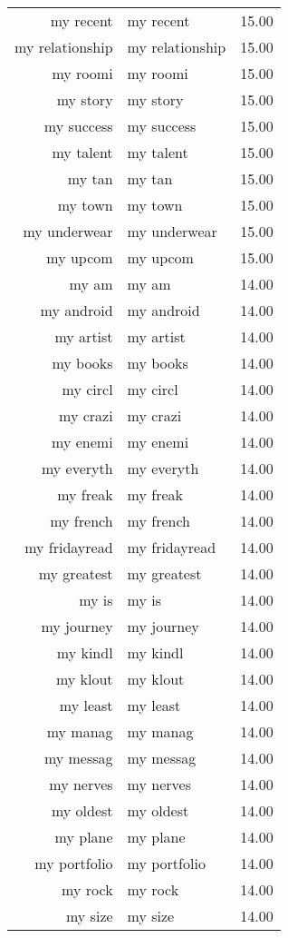 \begin{table}[ht]
\begin{tabular}{rlr}
  my recent & my recent & 15.00 \\ 
  my relationship & my relationship & 15.00 \\ 
  my roomi & my roomi & 15.00 \\ 
  my story & my story & 15.00 \\ 
  my success & my success & 15.00 \\ 
  my talent & my talent & 15.00 \\ 
  my tan & my tan & 15.00 \\ 
  my town & my town & 15.00 \\ 
  my underwear & my underwear & 15.00 \\ 
  my upcom & my upcom & 15.00 \\ 
  my am & my am & 14.00 \\ 
  my android & my android & 14.00 \\ 
  my artist & my artist & 14.00 \\ 
  my books & my books & 14.00 \\ 
  my circl & my circl & 14.00 \\ 
  my crazi & my crazi & 14.00 \\ 
  my enemi & my enemi & 14.00 \\ 
  my everyth & my everyth & 14.00 \\ 
  my freak & my freak & 14.00 \\ 
  my french & my french & 14.00 \\ 
  my fridayread & my fridayread & 14.00 \\ 
  my greatest & my greatest & 14.00 \\ 
  my is & my is & 14.00 \\ 
  my journey & my journey & 14.00 \\ 
  my kindl & my kindl & 14.00 \\ 
  my klout & my klout & 14.00 \\ 
  my least & my least & 14.00 \\ 
  my manag & my manag & 14.00 \\ 
  my messag & my messag & 14.00 \\ 
  my nerves & my nerves & 14.00 \\ 
  my oldest & my oldest & 14.00 \\ 
  my plane & my plane & 14.00 \\ 
  my portfolio & my portfolio & 14.00 \\ 
  my rock & my rock & 14.00 \\ 
  my size & my size & 14.00 \\ 

\end{tabular}
\end{table}
